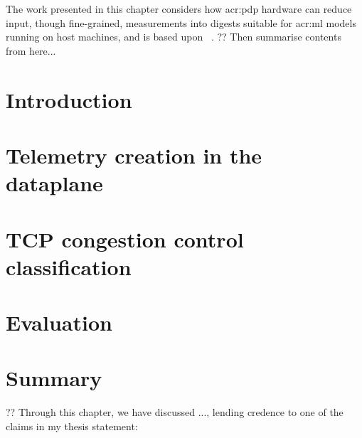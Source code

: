 The work presented in this chapter considers how \gls{acr:pdp} hardware can reduce input, though fine-grained, measurements into digests suitable for \gls{acr:ml} models running on host machines, and is based upon ~\parencite{DBLP:conf/globecom/SimpsonCP20}.
?? Then summarise contents from here...

\section{Introduction}\label{sec:seidr-introduction}


\section{Telemetry creation in the dataplane}\label{sec:seidr-architecture}


\section{TCP congestion control classification}\label{sec:seidr-tcpcc}


\section{Evaluation}\label{sec:seidr-evaluation}


% 

\section{Summary}\label{sec:seidr-conclustion}


?? Through this chapter, we have discussed ..., lending credence to one of the claims in my thesis statement: 
